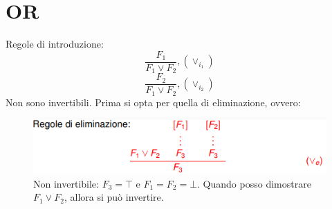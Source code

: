 \documentclass[12pt]{article}
\begin{document}
\section{OR}
Regole di introduzione:
\begin{equation}
    \dfrac{F_1}{F_1 \vee F_2}, (\vee_{i_1})
\end{equation}
\begin{equation}
    \dfrac{F_2}{F_1 \vee F_2}, (\vee_{i_2})
\end{equation}
Non sono invertibili. Prima si opta per quella di eliminazione, ovvero:
\begin{figure}[!htb]
    \centering
    \includegraphics[width=.9\linewidth,height=.40\textheight,keepaspectratio]{brutta/eliminazione_or.png} %
    \begin{center}
        \caption{\label{fig:eliminazione_or}Non invertibile: $F_3 = \top$ e $F_1 = F_2 = \bot$. Quando posso dimostrare $F_1 \vee F_2$, allora si può invertire.} %
    \end{center}
\end{figure}\\
\end{document}
